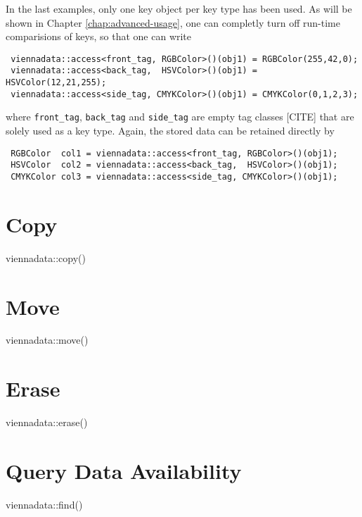 In the last examples, only one key object per key type has been used. As will be shown in 
Chapter \ref{chap:advanced-usage}, one can completly turn off run-time comparisions of keys,
so that one can write
\begin{lstlisting}
 viennadata::access<front_tag, RGBColor>()(obj1) = RGBColor(255,42,0);
 viennadata::access<back_tag,  HSVColor>()(obj1) = HSVColor(12,21,255);
 viennadata::access<side_tag, CMYKColor>()(obj1) = CMYKColor(0,1,2,3);
\end{lstlisting}
where \lstinline|front_tag|, \lstinline|back_tag| and \lstinline|side_tag| are empty tag classes [CITE] that are solely used as a key type.
Again, the stored data can be retained directly by 
\begin{lstlisting}
 RGBColor  col1 = viennadata::access<front_tag, RGBColor>()(obj1);
 HSVColor  col2 = viennadata::access<back_tag,  HSVColor>()(obj1);
 CMYKColor col3 = viennadata::access<side_tag, CMYKColor>()(obj1);
\end{lstlisting}

\section{Copy}
viennadata::copy()

\section{Move}
viennadata::move()

\section{Erase}
viennadata::erase()

\section{Query Data Availability}
viennadata::find()

